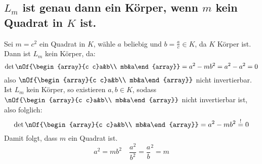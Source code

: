 \subsection{$L_m$ ist genau dann ein Körper, wenn $m$ kein Quadrat in $K$ ist.}
Sei $m=c^2$ ein Quadrat in $K$, wähle $a$ beliebig und $b = \frac{a}{c}\in K$, da $K$ Körper ist. Dann ist $L_m$ kein Körper, da:
\begin{equation}
	\det \nOf{\begin{array}{c c}a&b\\ mb&a\end{array}} = a^2 - m b^2 = a^2 - a^2 = 0
\end{equation}
also $\nOf{\begin{array}{c c}a&b\\ mb&a\end{array}}$ nicht invertierbar.\\
Ist $L_m$ kein Körper, so existieren $a,b\in K$, sodass $\nOf{\begin{array}{c c}a&b\\ mb&a\end{array}}$ nicht invertierbar ist, also folglich:
\begin{equation}
	\det \nOf{\begin{array}{c c}a&b\\ mb&a\end{array}} = a^2 - m b^2 \stackrel{!}{=} 0
\end{equation}
Damit folgt, dass $m$ ein Quadrat ist.
\begin{equation}
	a^2 = mb^2 \quad \frac{a^2}{b^2} = \frac{a}{b}^2 = m
\end{equation}

